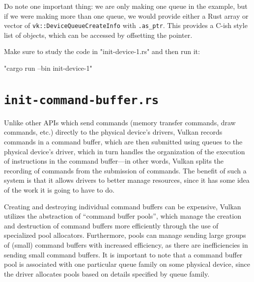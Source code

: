 \documentclass[12pt,letterpaper]{article}
\newcommand{\inquotes}[1]{``#1''}	%
\newcommand{\ril}[1]{\texttt{#1}}
\begin{document}
		Do note one important thing: we are only making one queue in the example, but if we were making more than one queue, we would provide either a Rust array or vector of \ril{vk::DeviceQueueCreateInfo} with \ril{.as_ptr}. This provides a C-ish style list of objects, which can be accessed by offsetting the pointer.
		
		Make sure to study the code in "init-device-1.rs" and then run it:
			\begin{center}
				"cargo run --bin init-device-1"
			\end{center}
		
\section{\texttt{init-command-buffer.rs}}
	Unlike other APIs which send commands (memory transfer commands, draw commands, etc.) directly to the physical device's drivers, Vulkan records commands in a command buffer, which are then submitted using queues to the physical device's driver, which in turn handles the organization of the execution of instructions in the command buffer---in other words, Vulkan splits the recording of commands from the submission of commands. The benefit of such a system is that it allows drivers to better manage resources, since it has some idea of the work it is going to have to do.
	
	Creating and destroying individual command buffers can be expensive, Vulkan utilizes the abstraction of \inquotes{command buffer pools}, which manage the creation and destruction of command buffers more efficiently through the use of specialized pool allocators. Furthermore, pools can manage sending large groups of (small) command buffers with increased efficiency, as there are inefficiencies in sending small command buffers. It is important to note that a command buffer pool is associated with one particular queue family on some physical device, since the driver allocates pools based on details specified by queue family.
	
\end{document}
